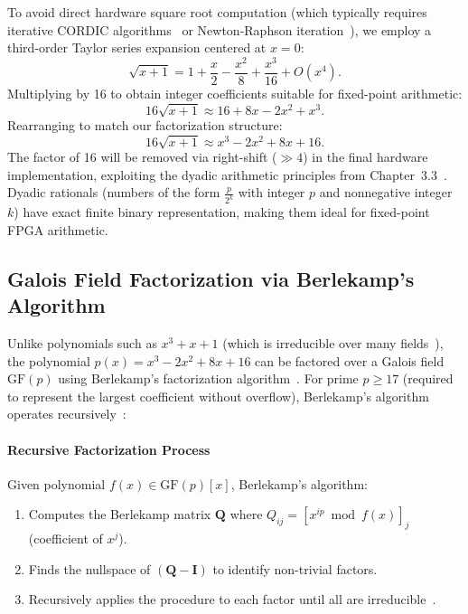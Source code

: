 To avoid direct hardware square root computation (which typically requires iterative CORDIC algorithms~\cite{Volder1959,Andraka1998} or Newton-Raphson iteration~\cite{Muller2006}), we employ a third-order Taylor series expansion centered at $x=0$:
\[
\sqrt{x+1} = 1 + \frac{x}{2} - \frac{x^2}{8} + \frac{x^3}{16} + O(x^4).
\]
Multiplying by 16 to obtain integer coefficients suitable for fixed-point arithmetic:
\[
16 \sqrt{x+1} \approx 16 + 8x - 2x^2 + x^3.
\]
Rearranging to match our factorization structure:
\[
16 \sqrt{x+1} \approx x^3 - 2 x^2 + 8 x + 16.
\]
The factor of 16 will be removed via right-shift ($\gg 4$) in the final hardware implementation, exploiting the dyadic arithmetic principles from Chapter~3.3~\cite{Muller2006,Abdi2024}. Dyadic rationals (numbers of the form $\frac{p}{2^k}$ with integer $p$ and nonnegative integer $k$) have exact finite binary representation, making them ideal for fixed-point FPGA arithmetic.

\subsection{Galois Field Factorization via Berlekamp's Algorithm}

Unlike polynomials such as $x^3 + x + 1$ (which is irreducible over many fields~\cite{lidl1997finite}), the polynomial $p(x) = x^3 - 2x^2 + 8x + 16$ can be factored over a Galois field $\mathrm{GF}(p)$ using Berlekamp's factorization algorithm~\cite{berlekamp1970factoring}. For prime $p \geq 17$ (required to represent the largest coefficient without overflow), Berlekamp's algorithm operates recursively~\cite{gathen2013modern}:

\paragraph{Recursive Factorization Process}

Given polynomial $f(x) \in \mathrm{GF}(p)[x]$, Berlekamp's algorithm:
\begin{enumerate}
    \item Computes the Berlekamp matrix $\mathbf{Q}$ where $Q_{ij} = [x^{ip} \bmod f(x)]_j$ (coefficient of $x^j$).
    \item Finds the nullspace of $(\mathbf{Q} - \mathbf{I})$ to identify non-trivial factors.
    \item Recursively applies the procedure to each factor until all are irreducible~\cite{berlekamp1970factoring}.
\end{enumerate}

